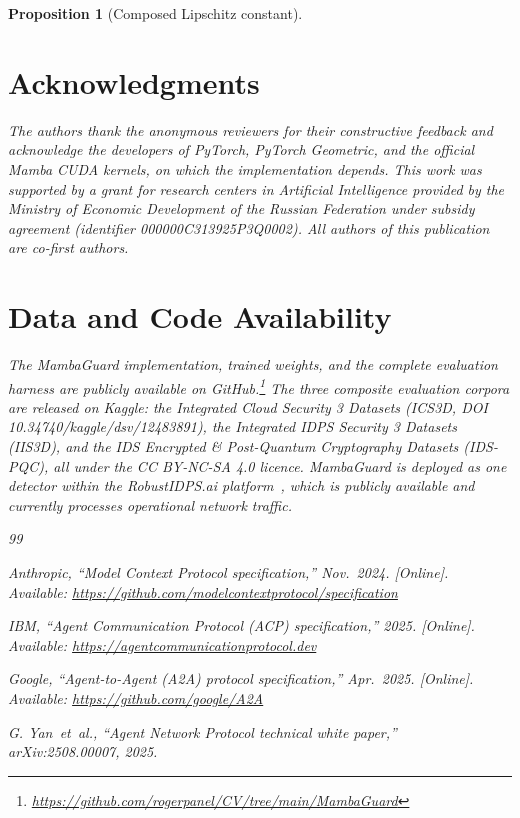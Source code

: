 \documentclass{ieeeaccess}
\newtheorem{proposition}[theorem]{Proposition}
\begin{document}
\begin{proposition}[Composed Lipschitz constant]
\section*{Acknowledgments}
The authors thank the anonymous reviewers for their constructive feedback and acknowledge the developers of PyTorch, PyTorch Geometric, and the official Mamba CUDA kernels, on which the implementation depends. This work was supported by a grant for research centers in Artificial Intelligence provided by the Ministry of Economic Development of the Russian Federation under subsidy agreement (identifier 000000C313925P3Q0002). All authors of this publication are co-first authors.

\section*{Data and Code Availability}
The MambaGuard implementation, trained weights, and the complete evaluation harness are publicly available on GitHub.\footnote{\url{https://github.com/rogerpanel/CV/tree/main/MambaGuard}} The three composite evaluation corpora are released on Kaggle: the Integrated Cloud Security 3 Datasets (ICS3D, DOI 10.34740/kaggle/dsv/12483891), the Integrated IDPS Security 3 Datasets (IIS3D), and the IDS Encrypted \& Post-Quantum Cryptography Datasets (IDS-PQC), all under the CC BY-NC-SA 4.0 licence. MambaGuard is deployed as one detector within the RobustIDPS.ai platform~\cite{Anonymous2026RobustIDPS}, which is publicly available and currently processes operational network traffic.


\begin{thebibliography}{99}

 Anthropic, ``Model Context Protocol specification,'' Nov.~2024. [Online]. Available: \url{https://github.com/modelcontextprotocol/specification}

 IBM, ``Agent Communication Protocol (ACP) specification,'' 2025. [Online]. Available: \url{https://agentcommunicationprotocol.dev}

 Google, ``Agent-to-Agent (A2A) protocol specification,'' Apr.~2025. [Online]. Available: \url{https://github.com/google/A2A}

 G. Yan~\textit{et~al.}, ``Agent Network Protocol technical white paper,'' arXiv:2508.00007, 2025.


\end{thebibliography}
\end{proposition}
\end{document}
